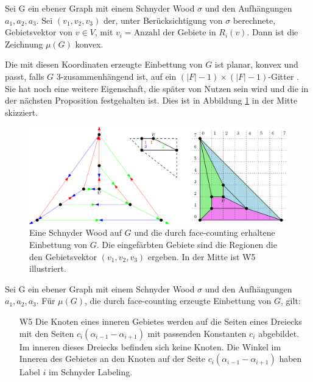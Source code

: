 \begin{theorem}
Sei G ein ebener Graph mit einem Schnyder Wood $\sigma$ und den Aufhängungen $a_1,a_2,a_3$. Sei $(v_1,v_2,v_3)$ der, unter Berücksichtigung von $\sigma$ berechnete, Gebietsvektor von $v \in V$, mit $ v_i = \text{Anzahl der Gebiete in }R_i(v).$ Dann ist die Zeichnung $\mu(G)$ konvex.
\end{theorem}

Die mit diesen Koordinaten erzeugte Einbettung von $G$ ist planar, konvex und passt, falls $G$ 3-zusammenhängend ist, auf ein $(|F|-1)\times(|F|-1)$-Gitter \cite[Korollar 2.8]{felsner04}. Sie hat noch eine weitere Eigenschaft, die später von Nutzen sein wird und die in der nächsten Proposition festgehalten ist.  Dies ist in Abbildung \ref{face_counting} in der Mitte skizziert.

\begin{figure}
	\centering
  \includegraphics[width=1\textwidth]{face_counting.png}
	\caption{Eine Schnyder Wood auf $G$ und die durch face-counting erhaltene Einbettung von $G$. Die eingefärbten Gebiete sind die Regionen die den Gebietsvektor $(v_1,v_2,v_3)$ ergeben. In der Mitte ist W5 illustriert.}
	\label{face_counting}
\end{figure}

\begin{proposition}\label{w5}
Sei G ein ebener Graph mit einem Schnyder Wood $\sigma$ und den Aufhängungen $a_1,a_2,a_3$. Für $\mu(G)$, die durch face-counting erzeugte Einbettung von $G$, gilt:
\begin{itemize}
\item [W5] Die Knoten eines inneren Gebietes werden auf die Seiten eines Dreiecks mit den Seiten $c_i(\alpha_{i-1}-\alpha_{i+1})$ mit passenden Konstanten $c_i$ abgebildet. Im inneren dieses Dreiecks befinden sich keine Knoten. Die Winkel im Inneren des Gebietes an den Knoten auf der Seite $c_i(\alpha_{i-1}-\alpha_{i+1})$ haben Label $i$ im Schnyder Labeling.
\end{itemize}
\end{proposition}

